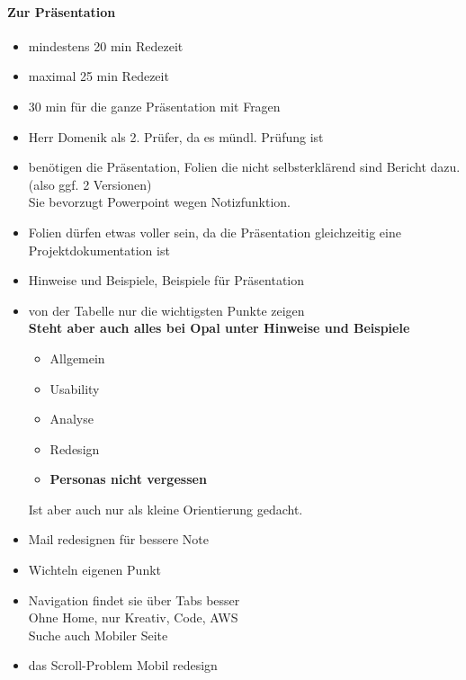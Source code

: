 \documentclass{scrartcl}
\begin{document}
\paragraph{Zur Präsentation}
\begin{itemize}
	\item mindestens 20 min Redezeit
	\item maximal 25 min Redezeit
	\item 30 min für die ganze Präsentation mit Fragen
	\item Herr Domenik als 2. Prüfer, da es mündl. Prüfung ist
	\item benötigen die Präsentation, Folien die nicht selbsterklärend sind Bericht dazu. (also ggf. 2 Versionen)\\
			Sie bevorzugt Powerpoint wegen Notizfunktion.
	\item Folien dürfen etwas voller sein, da die Präsentation gleichzeitig eine Projektdokumentation ist
	\item Hinweise und Beispiele, Beispiele für Präsentation
	\item von der Tabelle nur die wichtigsten Punkte zeigen\\
			\textbf{Steht aber auch alles bei Opal unter Hinweise und Beispiele}
			\begin{itemize}
				\item Allgemein
				\item Usability
				\item Analyse
				\item Redesign
				\item \textbf{Personas nicht vergessen}
			\end{itemize}
			Ist aber auch nur als kleine Orientierung gedacht.
	\item Mail redesignen für bessere Note
	\item Wichteln eigenen Punkt
	\item Navigation findet sie über Tabs besser\\
			Ohne Home, nur Kreativ, Code, AWS\\
			Suche auch Mobiler Seite
	\item das Scroll-Problem Mobil redesign
\end{itemize}
\end{document}
